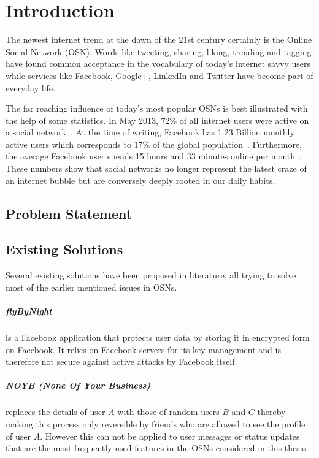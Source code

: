 \chapter{Introduction}
\label{cha:intro}
The newest internet trend at the dawn of the 21st century certainly is the Online Social Network (OSN). Words like tweeting, sharing, liking, trending and tagging have found common acceptance in the vocabulary of today's internet savvy users while services like Facebook, Google+, LinkedIn and Twitter have become part of everyday life. 

The far reaching influence of today's most popular OSNs is best illustrated with the help of some statistics. In May 2013, 72\% of all internet users were active on a social network~\cite{site:Jones13}. At the time of writing, Facebook has 1.23 Billion monthly active users which corresponds to 17\% of the global population~\cite{site:Bullas14,site:worldometers}. Furthermore, the average Facebook user spends 15 hours and 33 minutes online per month~\cite{site:StatisticBrain}. These numbers show that social networks no longer represent the latest craze of an internet bubble but are conversely deeply rooted in our daily habits.

\section{Problem Statement}


\section{Existing Solutions}
\label{sec:existing_solutions}
Several existing solutions have been proposed in literature, all trying to solve most of the earlier mentioned issues in OSNs.

\paragraph{flyByNight~\cite{art:LucasB09}} is a Facebook application that protects user data by storing it in encrypted form on Facebook. It relies on Facebook servers for its key management and is therefore not secure against active attacks by Facebook itself.

\paragraph{NOYB (None Of Your Business)~\cite{art:GuhaSTF08}} replaces the details of user $A$ with those of random users $B$ and $C$ thereby making this process only reversible by friends who are allowed to see the profile of user $A$. However this can not be applied to user messages or status updates that are the most frequently used features in the OSNs considered in this thesis.

